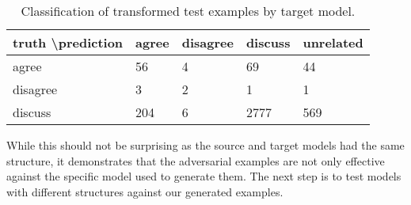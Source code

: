 \documentclass{article}
\begin{document}
\begin{table}[ht]
\centering
\begin{tabular}{|l|l|l|l|l|}
\hline
truth \textbackslash prediction & agree & disagree & discuss & unrelated \\ \hline
agree                           & 56    & 4        & 69      & 44        \\ \hline
disagree                        & 3     & 2        & 1       & 1         \\ \hline
discuss                         & 204   & 6        & 2777    & 569       \\ \hline
\end{tabular}
\caption{Classification of transformed test examples by target model.}
\label{table:transformed_target}
\end{table}

While this should not be surprising as the source and target models had the same structure, it demonstrates that the adversarial examples are not only effective against the specific model used to generate them. The next step is to test models with different structures against our generated examples.

\medskip



\end{document}
